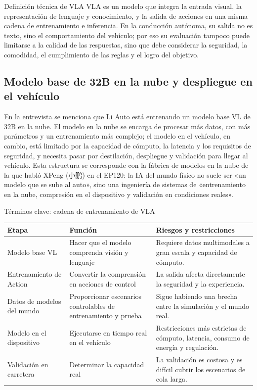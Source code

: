 \documentclass[a4paper]{article}
\begin{document}
\begin{importantbox}{Definición técnica de VLA}
VLA es un modelo que integra la entrada visual, la representación de lenguaje y conocimiento, y la salida de acciones en una misma cadena de entrenamiento e inferencia. En la conducción autónoma, su salida no es texto, sino el comportamiento del vehículo; por eso su evaluación tampoco puede limitarse a la calidad de las respuestas, sino que debe considerar la seguridad, la comodidad, el cumplimiento de las reglas y el logro del objetivo.
\end{importantbox}

\subsection{Modelo base de 32B en la nube y despliegue en el vehículo}

En la entrevista se menciona que Li Auto está entrenando un modelo base VL de 32B en la nube. El modelo en la nube se encarga de procesar más datos, con más parámetros y un entrenamiento más complejo; el modelo en el vehículo, en cambio, está limitado por la capacidad de cómputo, la latencia y los requisitos de seguridad, y necesita pasar por destilación, despliegue y validación para llegar al vehículo. Esta estructura se corresponde con la fábrica de modelos en la nube de la que habló XPeng (小鹏) en el EP120: la IA del mundo físico no suele ser «un modelo que se sube al auto», sino una ingeniería de sistemas de «entrenamiento en la nube, compresión en el dispositivo y validación en condiciones reales».

\begin{knowledgebox}{Términos clave: cadena de entrenamiento de VLA}
\begin{tabularx}{\textwidth}{p{}p{}X}
\toprule
Etapa & Función & Riesgos y restricciones \\
\midrule
Modelo base VL & Hacer que el modelo comprenda visión y lenguaje & Requiere datos multimodales a gran escala y capacidad de cómputo. \\
Entrenamiento de Action & Convertir la comprensión en acciones de control & La salida afecta directamente la seguridad y la experiencia. \\
Datos de modelos del mundo & Proporcionar escenarios controlables de entrenamiento y prueba & Sigue habiendo una brecha entre la simulación y el mundo real. \\
Modelo en el dispositivo & Ejecutarse en tiempo real en el vehículo & Restricciones más estrictas de cómputo, latencia, consumo de energía y regulación. \\
Validación en carretera & Determinar la capacidad real & La validación es costosa y es difícil cubrir los escenarios de cola larga. \\
\bottomrule
\end{tabularx}
\end{knowledgebox}
\end{document}
